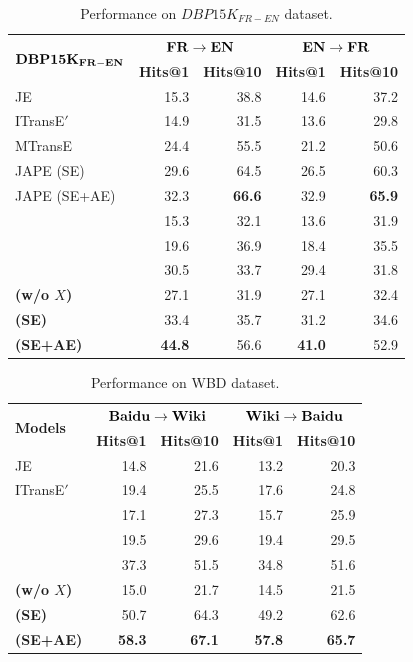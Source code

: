 \begin{table}
	\centering
	\scriptsize
	\begin{tabular}{lrrrr}
		\toprule
		\multirow{2}{*}{$\bf DBP15K_{FR-EN}$} & \multicolumn{2}{c|}{$\bf FR \rightarrow EN$} & \multicolumn{2}{c}{$\bf EN \rightarrow FR$} \\
		& \bf Hits@1 & \bf Hits@10 & \bf Hits@1 & \bf Hits@10 \\
		\midrule
		\rowcolor{Gray}JE & 15.3 & 38.8 & 14.6 & 37.2 \\
		ITransE$'$ & 14.9 & 31.5 & 13.6 & 29.8 \\
		\rowcolor{Gray}MTransE & 24.4 & 55.5 & 21.2 & 50.6 \\
		JAPE (SE) & 29.6 & 64.5 & 26.5 & 60.3 \\
		\rowcolor{Gray}JAPE (SE+AE) & 32.3 & \bf 66.6 & 32.9 & \bf 65.9 \\
		\GCN & 15.3 & 32.1 & 13.6 & 31.9 \\
		\rowcolor{Gray}\HGCN & 19.6 & 36.9 & 18.4 & 35.5 \\
		\RGCN & 30.5 & 33.7 & 29.4 & 31.8 \\
		\rowcolor{Gray}\bf \HRGCN (w/o $X$) & 27.1 & 31.9 & 27.1 & 32.4 \\
		\bf \HRGCN (SE) & 33.4& 35.7& 31.2& 34.6 \\
		\rowcolor{Gray} 	\bf \HRGCN (SE+AE) & \bf 44.8 & 56.6 &\bf 41.0 & 52.9 \\
		\bottomrule
	\end{tabular}
	\caption{Performance on $DBP15K_{FR-EN}$ dataset.}
	\label{cross}
\end{table}

\begin{table}
	\centering
	\scriptsize
	\begin{tabular}{lrrrr}
		\toprule
		\multirow{2}{*}{\bf Models} &  \multicolumn{2}{c|}{$\bf Baidu \rightarrow Wiki$} & \multicolumn{2}{c}{$\bf Wiki \rightarrow Baidu$} \\
		& \bf Hits@1 & \bf Hits@10 & \bf Hits@1 & \bf Hits@10 \\
		\midrule
		\rowcolor{Gray} JE & 14.8 & 21.6 & 13.2 & 20.3 \\
		ITransE$'$ & 19.4 & 25.5 & 17.6 & 24.8 \\
		\rowcolor{Gray} \GCN & 17.1 & 27.3 & 15.7 & 25.9 \\
		\HGCN & 19.5 & 29.6 & 19.4 & 29.5  \\
		\rowcolor{Gray} \RGCN & 37.3 & 51.5 & 34.8 & 51.6 \\
		\bf \HRGCN (w/o $X$) & 15.0 & 21.7 & 14.5 & 21.5 \\
		\rowcolor{Gray} \bf \HRGCN (SE) & 50.7 & 64.3 & 49.2 & 62.6 \\
		\bf \HRGCN (SE+AE) & \bf 58.3 & \bf 67.1 & \bf 57.8{\tiny } & \bf 65.7 \\
		\bottomrule
	\end{tabular}
	\caption{Performance on WBD dataset.}
	\label{f1}
\end{table}

